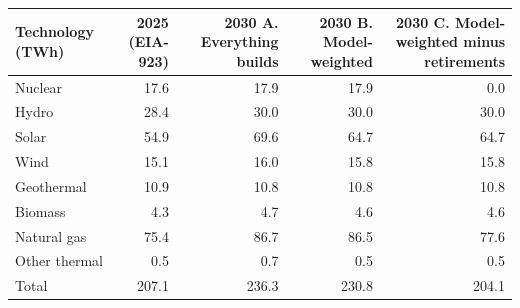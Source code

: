 \begin{tabular}{lrrrr}
\toprule
Technology (TWh) & 2025 (EIA-923) & 2030 A. Everything builds & 2030 B. Model-weighted & 2030 C. Model-weighted minus retirements \\
\midrule
Nuclear & 17.6 & 17.9 & 17.9 & 0.0 \\
Hydro & 28.4 & 30.0 & 30.0 & 30.0 \\
Solar & 54.9 & 69.6 & 64.7 & 64.7 \\
Wind & 15.1 & 16.0 & 15.8 & 15.8 \\
Geothermal & 10.9 & 10.8 & 10.8 & 10.8 \\
Biomass & 4.3 & 4.7 & 4.6 & 4.6 \\
Natural gas & 75.4 & 86.7 & 86.5 & 77.6 \\
Other thermal & 0.5 & 0.7 & 0.5 & 0.5 \\
\midrule Total & 207.1 & 236.3 & 230.8 & 204.1 \\
\bottomrule
\end{tabular}